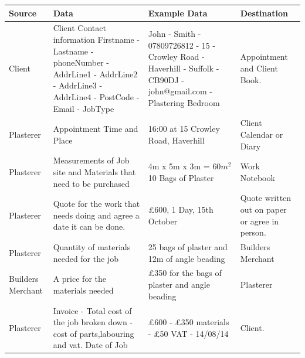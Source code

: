 \begin{center}
	
    \begin{tabular}{|p{3cm}|p{3cm}|p{3cm}|p{3cm}|}
		\hline
		\textbf{Source} & \textbf{Data} & \textbf{Example Data} & 			 \textbf{Destination} \\

 \hline

        Client  &

			{Client Contact information Firstname - Lastname -  phoneNumber - AddrLine1 - 
AddrLine2 - AddrLine3 - AddrLine4 - PostCode - Email - JobType} & 

John - Smith - 07809726812 - 15 -  Crowley Road - Haverhill - Suffolk - CB90DJ - john@gmail.com - Plastering Bedroom &

Appointment and Client Book.
			
        \\
\hline

Plasterer &

Appointment Time and Place &

16:00 at 15 Crowley Road, Haverhill &

Client Calendar or Diary 

\\
\hline
Plasterer &

Measurements of Job site and Materials that need to be purchased &

4m x 5m x 3m = $60m^2$ 10 Bags of Plaster &

Work Notebook 

\\
\hline
Plasterer &

Quote for the work that needs doing and agree a date it can be done. &

\pounds 600, 1 Day, 15th October & 

Quote written out on paper or agree in person.

\\
\hline

Plasterer &

Quantity of materials needed for the job &

25 bags of plaster and 12m of angle beading &

Builders Merchant

\\
\hline
Builders Merchant &

A price for the materials needed &

\pounds 350 for the bags of plaster and angle beading &

Plasterer


\\
\hline

Plasterer &

Invoice - Total cost of the job broken down - cost of parts,labouring and vat. Date of Job &

\pounds 600 - \pounds 350 materials - \pounds 50 VAT - 14/08/14 &

Client.

\\
        \hline
    \end{tabular}
\end{center}

